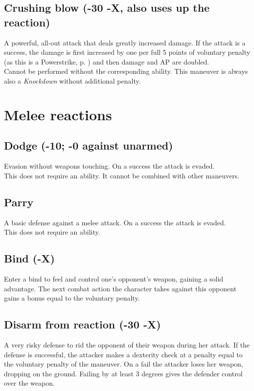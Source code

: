 \subsection*{Crushing blow (-30 -X, also uses up the reaction)}
A powerful, all-out attack that deals greatly increased damage.
If the attack is a success,
	the damage is first increased by one per full 5 points of voluntary penalty
	(as this is a Powerstrike, p. \pageref{mvr:powerstrike}) and
	then damage and AP are doubled.\\
Cannot be performed without the corresponding ability. This maneuver is always also a \emph{Knockdown} without additional penalty.

\pagebreak %
\section{Melee reactions}
\subsection*{Dodge (-10; -0 against unarmed)}
Evasion without weapons touching. On a success the attack is evaded.\\
This does not require an ability. It cannot be combined with other maneuvers.
\subsection*{Parry}
A basic defense against a melee attack. On a success the attack is evaded.\\
This does not require an ability.
\subsection*{Bind (-X)}
Enter a bind to feel and control one’s opponent’s weapon,
	gaining a solid advantage.
The next combat action the character takes against this opponent gains a bonus equal to the voluntary penalty.
\subsection*{Disarm from reaction (-30 -X)}
A very risky defense to rid the opponent of their weapon during her attack. If the defense is successful, the attacker makes a dexterity check at a penalty equal to the voluntary penalty of the maneuver. On a fail the attacker loses her weapon, dropping on the ground. Failing by at least 3 degrees gives the defender control over the weapon.
